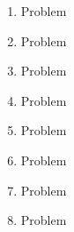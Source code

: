 \documentclass[10pt, twoside]{article}
\begin{document}
\begin{justify}
\begin{enumerate}[itemsep=3.76389mm]
\ans{}{}{}{}{}

\item Problem

\ans{}{}{}{}{}

\item Problem

\ans{}{}{}{}{}

\item Problem

\ans{}{}{}{}{}

\item Problem

\ans{}{}{}{}{}

\item Problem

\ans{}{}{}{}{}

\item Problem

\ans{}{}{}{}{}

\item Problem

\ans{}{}{}{}{}

\item Problem

\ans{}{}{}{}{}
\end{enumerate}


\end{justify}
\end{document}
